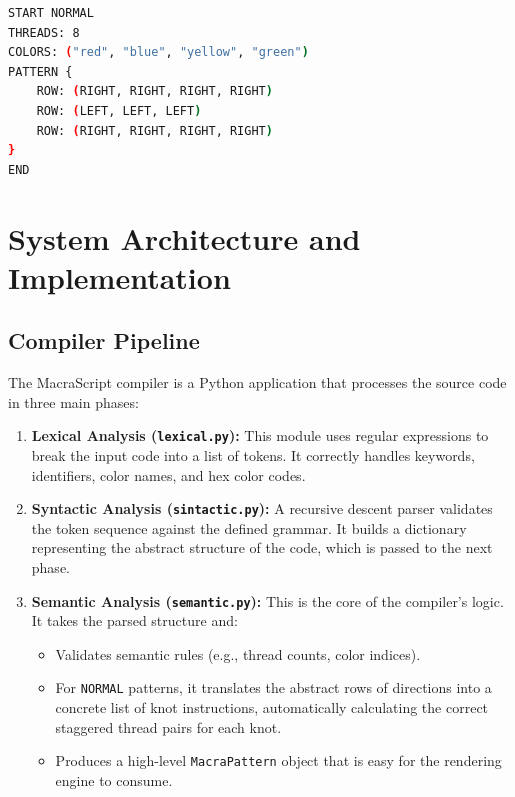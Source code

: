 \documentclass[12pt,a4paper]{report}
\begin{document}
\begin{lstlisting}[language=bash, caption={Normal pattern with alternating rows}]
START NORMAL
THREADS: 8
COLORS: ("red", "blue", "yellow", "green")
PATTERN {
    ROW: (RIGHT, RIGHT, RIGHT, RIGHT)
    ROW: (LEFT, LEFT, LEFT)
    ROW: (RIGHT, RIGHT, RIGHT, RIGHT)
}
END
\end{lstlisting}

\chapter{System Architecture and Implementation}

\section{Compiler Pipeline}
The MacraScript compiler is a Python application that processes the source code in three main phases:

\begin{enumerate}
    \item \textbf{Lexical Analysis (\texttt{lexical.py}):} This module uses regular expressions to break the input code into a list of tokens. It correctly handles keywords, identifiers, color names, and hex color codes.
    
    \item \textbf{Syntactic Analysis (\texttt{sintactic.py}):} A recursive descent parser validates the token sequence against the defined grammar. It builds a dictionary representing the abstract structure of the code, which is passed to the next phase.
    
    \item \textbf{Semantic Analysis (\texttt{semantic.py}):} This is the core of the compiler's logic. It takes the parsed structure and:
    \begin{itemize}
        \item Validates semantic rules (e.g., thread counts, color indices).
        \item For \texttt{NORMAL} patterns, it translates the abstract rows of directions into a concrete list of knot instructions, automatically calculating the correct staggered thread pairs for each knot.
        \item Produces a high-level \texttt{MacraPattern} object that is easy for the rendering engine to consume.
    \end{itemize}
\end{enumerate}
\end{document}
